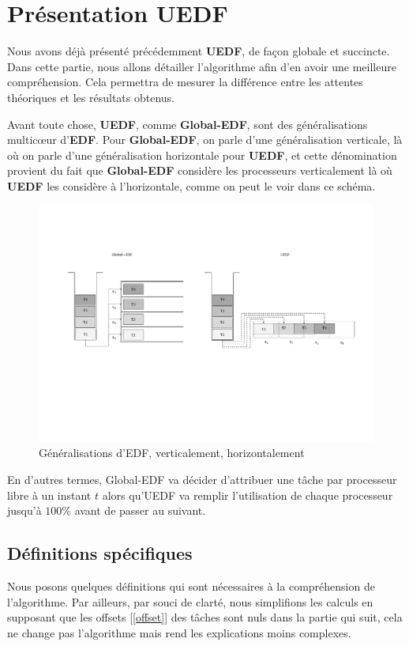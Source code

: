 	
	\section{Présentation UEDF}\label{contexte}
	
	Nous avons déjà présenté précédemment \textbf{UEDF}, de façon globale et succincte. 
	Dans cette partie, nous allons détailler l'algorithme afin d'en avoir une meilleure compréhension. Cela 
	permettra de mesurer la différence entre les attentes théoriques et les résultats obtenus.\newline
	
	Avant toute chose, \textbf{UEDF}, comme \textbf{Global-EDF}, sont des généralisations multicœur d'\textbf{EDF}. 
	Pour \textbf{Global-EDF}, on parle d'une généralisation verticale, là où on parle d'une généralisation horizontale pour 
	\textbf{UEDF}, et cette dénomination provient du fait que \textbf{Global-EDF} considère les processeurs \og{}verticalement\fg{} là où 
	\textbf{UEDF} les considère à l'horizontale, comme on peut le voir dans ce schéma.
	
	\begin{figure}[H]
		\caption{Généralisations d'EDF, verticalement, horizontalement}
		\includegraphics[scale=0.5]{img/wcet/comparo_GEDF_UEDF}
	\end{figure}

	En d'autres termes, Global-EDF va décider d'attribuer une tâche par processeur libre à un instant $t$ alors 
	qu'UEDF va \og{}remplir\fg{} l'utilisation de chaque processeur jusqu'à $100$\% avant de passer au suivant. 
	
	\subsection{Définitions spécifiques}
	Nous posons quelques définitions qui sont nécessaires à la compréhension de l'algorithme. 
	Par ailleurs, par souci de clarté, nous simplifions les calculs en supposant que les offsets [\ref*{offset}] des tâches 
	sont nuls dans la partie qui suit, cela ne change pas l'algorithme mais rend les explications moins 
	complexes.
	

